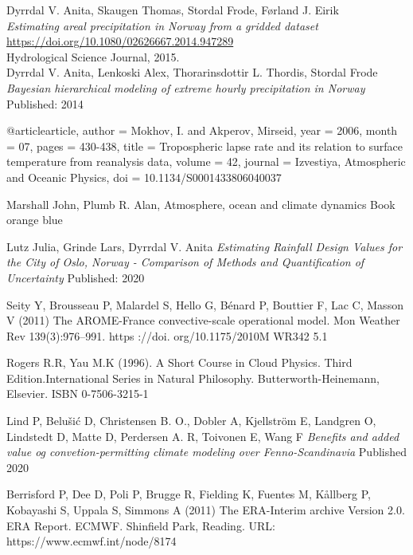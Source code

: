 \begin{thebibliography}{9}

Dyrrdal V. Anita, Skaugen Thomas, Stordal Frode, Førland J. Eirik \\
\textit{Estimating areal precipitation in Norway from a gridded dataset}\\
\url{https://doi.org/10.1080/02626667.2014.947289} \\
Hydrological Science Journal, 2015.\\

Dyrrdal V. Anita, Lenkoski Alex, Thorarinsdottir L. Thordis, Stordal Frode
\textit{Bayesian hierarchical modeling of extreme hourly precipitation in Norway}
Published: 2014

@article{article,
author = {Mokhov, I. and Akperov, Mirseid},
year = {2006},
month = {07},
pages = {430-438},
title = {Tropospheric lapse rate and its relation to surface temperature from reanalysis data},
volume = {42},
journal = {Izvestiya, Atmospheric and Oceanic Physics},
doi = {10.1134/S0001433806040037}
}

Marshall John, Plumb R. Alan, Atmosphere, ocean and climate dynamics
Book orange blue

Lutz Julia, Grinde Lars, Dyrrdal V. Anita
\textit{Estimating Rainfall Design Values for the City of Oslo, Norway - Comparison of Methods and Quantification of Uncertainty}
Published: 2020

Seity Y, Brousseau P, Malardel S, Hello G, Bénard P, Bouttier F,
Lac C, Masson V (2011) The AROME-France convective-scale
operational model. Mon Weather Rev 139(3):976–991. https ://doi.
org/10.1175/2010M WR342 5.1

Rogers R.R, Yau M.K (1996). A Short Course in Cloud Physics. Third Edition.International Series in Natural Philosophy.
Butterworth-Heinemann, Elsevier.
ISBN 0-7506-3215-1 

Lind P, Belušić D, Christensen B. O., Dobler A, Kjellström E, Landgren O, Lindstedt D, Matte D, Perdersen A. R, Toivonen E, Wang F
\textit{Benefits and added value og convetion-permitting climate modeling over Fenno-Scandinavia}
Published 2020

Berrisford P, Dee D, Poli P, Brugge R, Fielding K, Fuentes M, Kållberg P, Kobayashi S, Uppala S, Simmons A (2011)
The ERA-Interim archive Version 2.0. ERA Report. ECMWF. Shinfield Park, Reading. URL: https://www.ecmwf.int/node/8174


\end{thebibliography}
